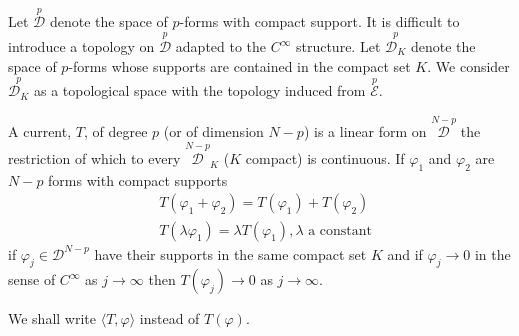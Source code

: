 Let $\overset{p}{\mathscr{D}}$ denote the space of $p$-forms with
compact support. It is difficult to introduce a topology on
$\overset{p}{\mathscr{D}}$ adapted to the $C^{\infty}$\pageoriginale
structure. Let 
$\overset{p}{\mathscr{D}_{K}}$ denote the space of $p$-forms whose
supports are contained in the compact set $K$. We consider
$\overset{p}{\mathscr{D}_{K}}$ as a topological space with the
topology induced from $\overset{p}{\mathscr{E}}$.

A current, $T$, of degree $p$ (or of dimension $N-p$) is a linear form
on $\overset{N-p}{\mathscr{D}}$ the restriction of which to every
$\overset{N-p}{\mathscr{D}}_{K}$ ($K$ compact) is continuous. If $\varphi_{1}$
and $\varphi_{2}$ are $N-p$ forms with compact supports
\begin{align*}
& T(\varphi_{1}+\varphi_{2})=T(\varphi_{1})+T(\varphi_{2})\\
& T(\lambda \varphi_{1})=\lambda T(\varphi_{1}),\lambda \text{ \ a constant}
\end{align*}
if $\varphi_{j}\in \mathscr{D}^{N-p}$ have their supports in the same
compact set $K$ and if $\varphi_{j}\to 0$ in the sense of $C^{\infty}$
as $j\to \infty$ then $T(\varphi_{j})\to 0$ as $j\to \infty$.

We shall write $\langle T,\varphi\rangle$ instead of $T(\varphi)$. 



